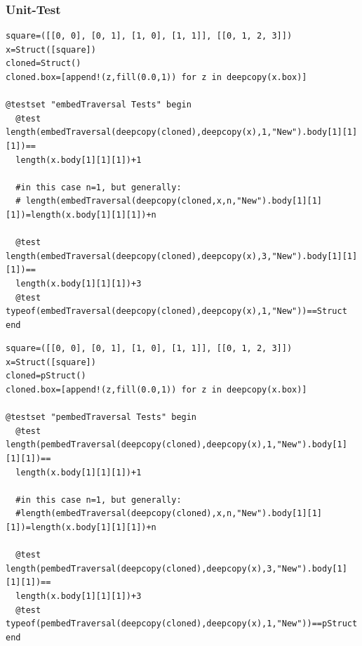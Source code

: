 \documentclass[a4paper,12pt]{article}
\begin{document}
\subsubsection{Unit-Test}
\begin{Verbatim}[fontsize=\footnotesize]
square=([[0, 0], [0, 1], [1, 0], [1, 1]], [[0, 1, 2, 3]])
x=Struct([square])
cloned=Struct()
cloned.box=[append!(z,fill(0.0,1)) for z in deepcopy(x.box)]

@testset "embedTraversal Tests" begin
  @test length(embedTraversal(deepcopy(cloned),deepcopy(x),1,"New").body[1][1][1])==
  length(x.body[1][1][1])+1
  
  #in this case n=1, but generally:
  # length(embedTraversal(deepcopy(cloned,x,n,"New").body[1][1][1])=length(x.body[1][1][1])+n
  
  @test length(embedTraversal(deepcopy(cloned),deepcopy(x),3,"New").body[1][1][1])==
  length(x.body[1][1][1])+3
  @test typeof(embedTraversal(deepcopy(cloned),deepcopy(x),1,"New"))==Struct	
end

\end{Verbatim}
\noindent{}
\begin{Verbatim}[fontsize=\footnotesize]
square=([[0, 0], [0, 1], [1, 0], [1, 1]], [[0, 1, 2, 3]])
x=Struct([square])
cloned=pStruct()
cloned.box=[append!(z,fill(0.0,1)) for z in deepcopy(x.box)]

@testset "pembedTraversal Tests" begin
  @test length(pembedTraversal(deepcopy(cloned),deepcopy(x),1,"New").body[1][1][1])==
  length(x.body[1][1][1])+1
  
  #in this case n=1, but generally:
  #length(embedTraversal(deepcopy(cloned),x,n,"New").body[1][1][1])=length(x.body[1][1][1])+n
  
  @test length(pembedTraversal(deepcopy(cloned),deepcopy(x),3,"New").body[1][1][1])==
  length(x.body[1][1][1])+3
  @test typeof(pembedTraversal(deepcopy(cloned),deepcopy(x),1,"New"))==pStruct	
end

\end{Verbatim}
\end{document}
